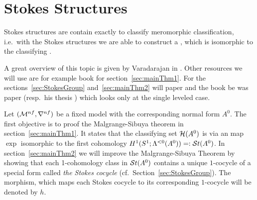 \chapter{Stokes Structures}\label{chap:stokes}
Stokes structures are contain exactly  to
classify meromorphic classification, i.e.\ with the Stokes structures we are
able to construct a , which is isomorphic to the classifying
.

A great overview of this topic is given by Varadarajan in
\cite{Varadarajan96linearmeromorphic}. Other resources we will use are for
example  book \cite[section II]{sabbah2007isomonodromic} for
section~\ref{sec:mainThm1}.
For the sections~\ref{sec:StokesGroup} and~\ref{sec:mainThm2} will
 paper \cite{Loday1994} and the book \cite{Loday2014}
be  was  paper \cite{boalch}
(resp.\ his thesis \cite{thboalch}) which looks only at the single leveled
case.

Let $(\mathcal{M}^{nf},\nabla^{nf})$ be a fixed model with the corresponding normal
form $A^0$.  The first objective is to proof the Malgrange-Sibuya theorem
in section~\ref{sec:mainThm1}. It states that the classifying set $\mathcal{H}(A^0)$
is via an map $\exp$ isomorphic to the first cohomology
$H^1(S^1;\Lambda^{<0}(A^0))=:\mathcal{S}{}t(A^0)$.
In section~\ref{sec:mainThm2} we will improve the Malgrange-Sibuya Theorem by
showing that each 1-cohomology class in $\mathcal{S}{}t(A^0)$ contains a unique
$1$-cocycle of a special form called \emph{the Stokes cocycle}
(cf.\ Section~\ref{sec:StokesGroup}).
The morphism, which maps each Stokes cocycle to its corresponding $1$-cocycle
will be denoted by $h$.

